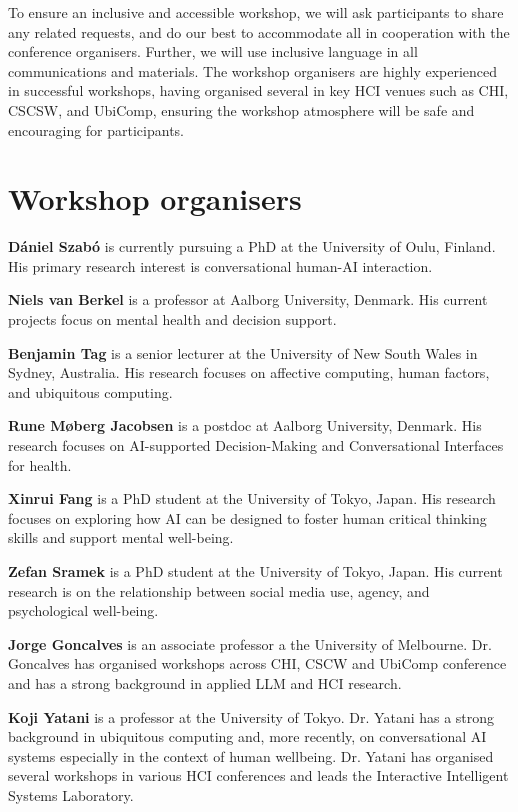 \documentclass[manuscript,screen,review]{acmart}
\begin{document}
To ensure an inclusive and accessible workshop, we will ask participants to share any related requests, and do our best to accommodate all in cooperation with the conference organisers. 
Further, we will use inclusive language in all communications and materials. The workshop organisers are highly experienced in successful workshops, having organised several in key HCI venues such as CHI, CSCSW, and UbiComp, ensuring the workshop atmosphere will be safe and encouraging for participants.

\section*{Workshop organisers}

\noindent\textbf{Dániel Szabó} is currently pursuing a PhD at the University of Oulu, Finland. His primary research interest is conversational human-AI interaction.

\noindent\textbf{Niels van Berkel} is a professor at Aalborg University, Denmark. His current projects focus on mental health and decision support.

\noindent\textbf{Benjamin Tag} is a senior lecturer at the University of New South Wales in Sydney, Australia. His research focuses on affective computing, human factors, and ubiquitous computing. 

\noindent\textbf{Rune Møberg Jacobsen} is a postdoc at Aalborg University, Denmark. His research focuses on AI-supported Decision-Making and Conversational Interfaces for health. 

\noindent\textbf{Xinrui Fang} is a PhD student at the University of Tokyo, Japan. His research focuses on exploring how AI can be designed to foster human critical thinking skills and support mental well-being.

\noindent\textbf{Zefan Sramek} is a PhD student at the University of Tokyo, Japan. His current research is on the relationship between social media use, agency, and psychological well-being.

\noindent\textbf{Jorge Goncalves} is an associate professor a the University of Melbourne. Dr. Goncalves has organised workshops across CHI, CSCW and UbiComp conference and has a strong background in applied LLM and HCI research.

\noindent\textbf{Koji Yatani} is a professor at the University of Tokyo. Dr. Yatani has a strong background in ubiquitous computing and, more recently, on conversational AI systems especially in the context of human wellbeing. Dr. Yatani has organised several workshops in various HCI conferences and leads the Interactive Intelligent Systems Laboratory.
\end{document}
